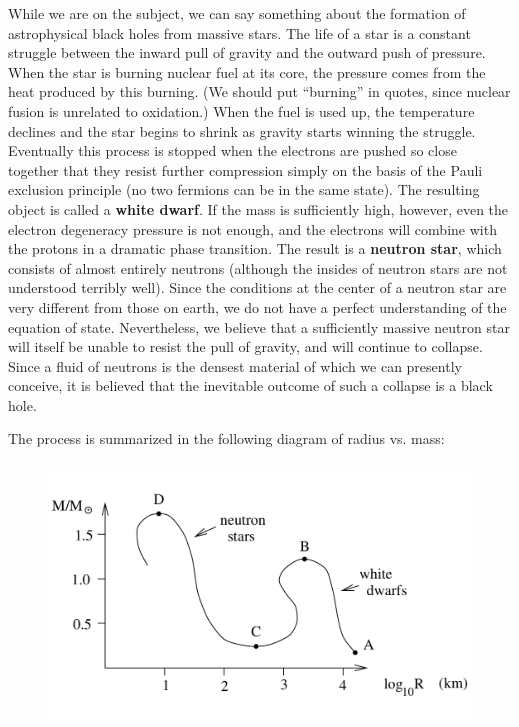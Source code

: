 \documentclass[12pt]{article}
\begin{document}
While we are on the subject, we can say something about the formation
of astrophysical black holes from massive stars.  The life of a star
is a constant struggle between the inward pull of gravity and the
outward push of pressure.  When the star is burning nuclear fuel at
its core, the pressure comes from the heat produced by this burning.
(We should put ``burning'' in quotes, since nuclear fusion is unrelated
to oxidation.)  When the fuel is used up, the temperature declines and
the star begins to shrink as gravity starts winning the struggle.
Eventually this process is stopped when the electrons are pushed so
close together that they resist further compression simply on the
basis of the Pauli exclusion principle (no two fermions can be in the
same state).  The resulting object is called a {\bf white dwarf}.
If the mass is sufficiently high, however, even the electron 
degeneracy pressure is not enough, and the electrons will combine
with the protons in a dramatic phase transition.  The result is a
{\bf neutron star}, which consists of almost entirely neutrons (although
the insides of neutron stars are not understood terribly well).
Since the conditions at the center of a neutron star are very different
from those on earth, we do not have a perfect understanding of the
equation of state.  Nevertheless, we believe that a
sufficiently massive neutron star will itself be unable to resist the
pull of gravity, and will continue to collapse.  Since a fluid of
neutrons is the densest material of which we can presently conceive,
it is believed that the inevitable outcome of such a collapse is
a black hole.

The process is summarized in the following diagram of radius vs.
mass:

\begin{figure}[h]
  \centerline{
  \includegraphics[height=7cm]{pdf/seven19}}
\end{figure}
\end{document}
